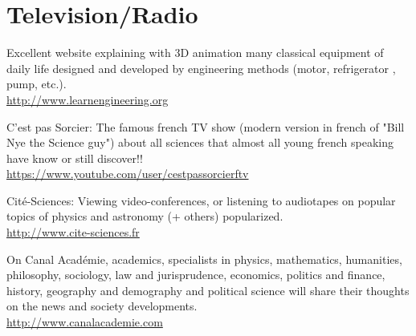 	\section{Television/Radio}

	{\Large {}} Excellent website explaining with 3D animation many classical equipment of daily life designed and developed by engineering methods (motor, refrigerator , pump, etc.).\\
	\href{http://www.learnengineering.org}{\color{blue}http://www.learnengineering.org}
	
	\bcdfrance{} C'est pas Sorcier: The famous french TV show (modern version in french of "Bill Nye the Science guy") about all sciences that almost all young french speaking have know or still discover!!\\
	\href{https://www.youtube.com/user/cestpassorcierftv}{\color{blue}https://www.youtube.com/user/cestpassorcierftv}
	
	\bcdfrance{} Cité-Sciences: Viewing video-conferences, or listening to audiotapes on popular topics of physics and astronomy (+ others) popularized.\\
	\href{http://www.cite-sciences.fr}{\color{blue}http://www.cite-sciences.fr}
	
	\bcdfrance{} On Canal Académie, academics, specialists in physics, mathematics, humanities, philosophy, sociology, law and jurisprudence, economics, politics and finance, history, geography and demography and political science will share their thoughts on the news and society developments.\\
	\href{http://www.canalacademie.com}{\color{blue}http://www.canalacademie.com}
	
